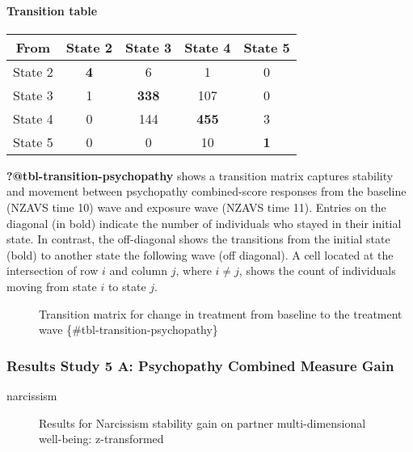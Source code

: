\documentclass[
  singlecolumn]{article}
\let\oldparagraph\paragraph
\renewcommand{\paragraph}[1]{\oldparagraph{#1}\mbox{}}
\begin{document}
\paragraph{Transition table}\label{transition-table-4}

\begin{longtable}[]{@{}ccccc@{}}
\toprule\noalign{}
From & State 2 & State 3 & State 4 & State 5 \\
\midrule\noalign{}
\endhead
\bottomrule\noalign{}
\endlastfoot
State 2 & \textbf{4} & 6 & 1 & 0 \\
State 3 & 1 & \textbf{338} & 107 & 0 \\
State 4 & 0 & 144 & \textbf{455} & 3 \\
State 5 & 0 & 0 & 10 & \textbf{1} \\
\end{longtable}

\begin{description}
\item[\textbf{?@tbl-transition-psychopathy} shows a transition matrix
captures stability and movement between psychopathy combined-score
responses from the baseline (NZAVS time 10) wave and exposure wave
(NZAVS time 11). Entries on the diagonal (in bold) indicate the number
of individuals who stayed in their initial state. In contrast, the
off-diagonal shows the transitions from the initial state (bold) to
another state the following wave (off diagonal). A cell located at the
intersection of row \(i\) and column \(j\), where \(i \neq j\), shows
the count of individuals moving from state \(i\) to state \(j\).]
Transition matrix for change in treatment from baseline to the treatment
wave \{\#tbl-transition-psychopathy\}
\end{description}

\subsubsection{Results Study 5 A: Psychopathy Combined Measure
Gain}\label{results-study-5-a-psychopathy-combined-measure-gain}

narcissism

\begin{figure}


\caption{\label{fig-results-psychopathy-gain}Results for Narcissism
stability gain on partner multi-dimensional well-being: z-transformed}

\end{figure}%
\end{document}
